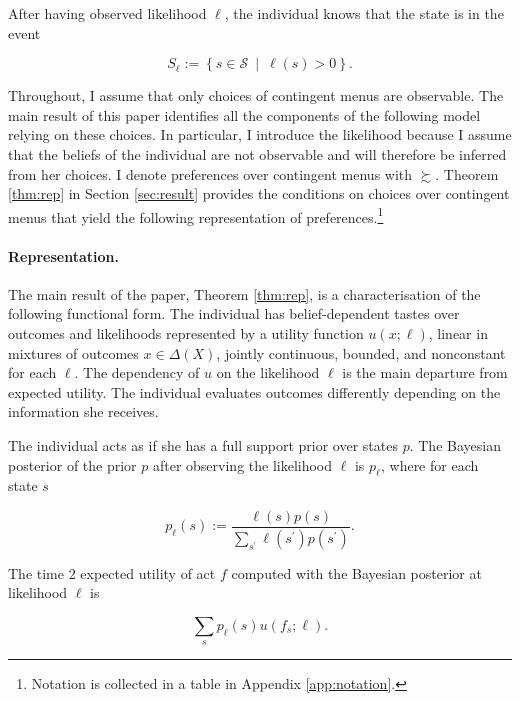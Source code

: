 After having observed likelihood \( \ell \), the individual knows that the state is in the event

\[
	S_{\ell} := \left\{ s \in \mathcal{S} \: \middle\vert  \: \ell \left( s \right) > 0 \right\} .
\]

Throughout, I assume that only choices of contingent menus are observable. The main result of this paper identifies all the components of the following model relying on these choices. In particular, I introduce the likelihood because I assume that the beliefs of the individual are not observable and will therefore be inferred from her choices. I denote preferences over contingent menus with \( \succsim \). Theorem \ref{thm:rep} in Section \ref{sec:result} provides the conditions on choices over contingent menus that yield the following representation of preferences.\footnote{Notation is collected in a table in Appendix \ref{app:notation}.}

\paragraph{Representation.} The main result of the paper, Theorem \ref{thm:rep}, is a characterisation of the following functional form. The individual has belief-dependent tastes over outcomes and likelihoods represented by a utility function \( u \left( x ; \ell \right) \), linear in mixtures of outcomes \( x \in \Delta \left( X \right) \), jointly continuous, bounded, and nonconstant for each \( \ell \). The dependency of \( u \) on the likelihood \( \ell \) is the main departure from expected utility. The individual evaluates outcomes differently depending on the information she receives.

The individual acts as if she has a full support prior over states \( p \). The Bayesian posterior of the prior \( p \) after observing the likelihood \( \ell \) is \( p_{\ell} \), where for each state \( s \)

\[
	p_{\ell} \left( s \right) := \frac{\ell \left( s \right) p \left( s \right)}{\sum_{s^{\prime}} \ell \left( s^{\prime} \right)  p \left( s^{\prime} \right)}.
\]

The time \( 2 \) expected utility of act \( f \) computed with the Bayesian posterior at likelihood \( \ell \) is

\begin{equation}\label{eq:eu}
	\sum_{s} p_{\ell} \left( s \right) u \left( f_{s} ; \ell \right).
\end{equation}


